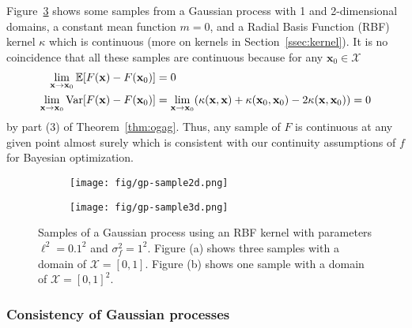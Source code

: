 Figure~\ref{fig:gp-sample} shows some samples from a Gaussian process with 1 and 2-dimensional domains, a constant mean function $m = 0$, and a Radial Basis Function (RBF) kernel $\kappa$ which is continuous (more on kernels in Section~\ref{ssec:kernel}).
It is no coincidence that all these samples are continuous because for any $\mathbf{x}_0 \in \mathcal{X}$
\begin{align*}
    \lim_{\mathbf{x} \to \mathbf{x}_0 }\mathbb{E}[F(\mathbf{x}) - F(\mathbf{x}_0)] & = 0 \\
    \lim_{\mathbf{x} \to \mathbf{x}_0 }\operatorname{Var}[F(\mathbf{x}) - F(\mathbf{x}_0)] & =
    \lim_{\mathbf{x} \to \mathbf{x}_0} (\kappa(\mathbf{x}, \mathbf{x}) + \kappa(\mathbf{x}_0, \mathbf{x}_0) - 2\kappa(\mathbf{x}, \mathbf{x}_0))
    = 0
\end{align*}
by part (3) of Theorem~\ref{thm:ogag}.
Thus, any sample of $F$ is continuous at any given point almost surely which is consistent with our continuity assumptions of $f$ for Bayesian optimization.

\begin{figure}
    \centering
    \begin{subfigure}[b]{0.45\textwidth}
        \centering
        \texttt{[image: fig/gp-sample2d.png]}
        \caption{}
        \label{subfig:2d-gp-sample}
    \end{subfigure}
    \hfill
    \begin{subfigure}[b]{0.45\textwidth}
        \centering
        \texttt{[image: fig/gp-sample3d.png]}
        \caption{}
        \label{subfig:3d-gp-sample}
    \end{subfigure}
    \hfill
    \caption{Samples of a Gaussian process using an RBF kernel with parameters $\ell^{2} = 0.1^2$ and $\sigma^{2}_f = 1 ^ 2$.
    Figure (a) shows three samples with a domain of $\mathcal{X} = [0, 1]$.
    Figure (b) shows one sample with a domain of $\mathcal{X} = [0, 1]^2$.
    }
    \label{fig:gp-sample}
\end{figure}

\subsubsection{Consistency of Gaussian processes}

